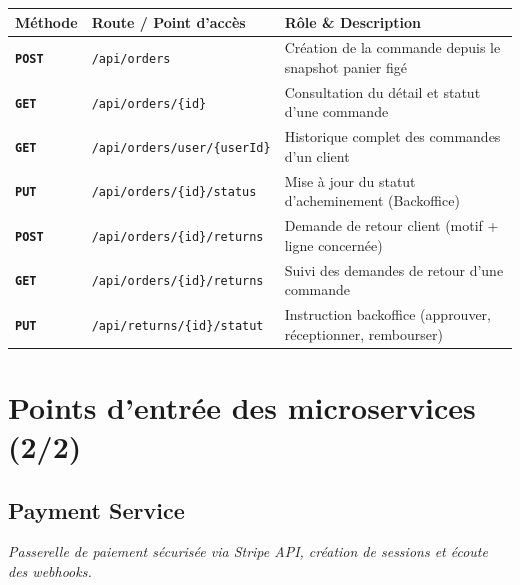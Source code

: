 \documentclass[10pt,a4paper]{article}
\newcounter{savedsubsection}
\begin{document}
\begin{center}
\renewcommand{\arraystretch}{1.08}
\begin{tabularx}{\textwidth}{@{} l p{6.8cm} >{\raggedright\arraybackslash}X @{}}
\toprule[0.8pt]
\rowcolor{hdrcolor}
\textbf{Méthode} & \textbf{Route / Point d'accès} & \textbf{Rôle \& Description} \\
\midrule
\textcolor{postgreen}{\texttt{\textbf{POST}}} & \texttt{/api/orders} & Création de la commande depuis le snapshot panier figé \\
\textcolor{syncblue}{\texttt{\textbf{GET}}}  & \texttt{/api/orders/\{id\}} & Consultation du détail et statut d'une commande \\
\textcolor{syncblue}{\texttt{\textbf{GET}}}  & \texttt{/api/orders/user/\{userId\}} & Historique complet des commandes d'un client \\
\textcolor{secondary}{\texttt{\textbf{PUT}}}  & \texttt{/api/orders/\{id\}/status} & Mise à jour du statut d'acheminement (Backoffice) \\
\textcolor{postgreen}{\texttt{\textbf{POST}}} & \texttt{/api/orders/\{id\}/returns} & Demande de retour client (motif + ligne concernée) \\
\textcolor{syncblue}{\texttt{\textbf{GET}}}  & \texttt{/api/orders/\{id\}/returns} & Suivi des demandes de retour d'une commande \\
\textcolor{secondary}{\texttt{\textbf{PUT}}}  & \texttt{/api/returns/\{id\}/statut} & Instruction backoffice (approuver, réceptionner, rembourser) \\
\bottomrule[0.8pt]
\end{tabularx}
\end{center}

\newpage

\setcounter{savedsubsection}{\value{subsection}}
\addtocounter{section}{-1}
\section{Points d'entrée des microservices (2/2)}
\setcounter{subsection}{\value{savedsubsection}}

\subsection{Payment Service}
\textit{Passerelle de paiement sécurisée via Stripe API, création de sessions et écoute des webhooks.}
\end{document}
